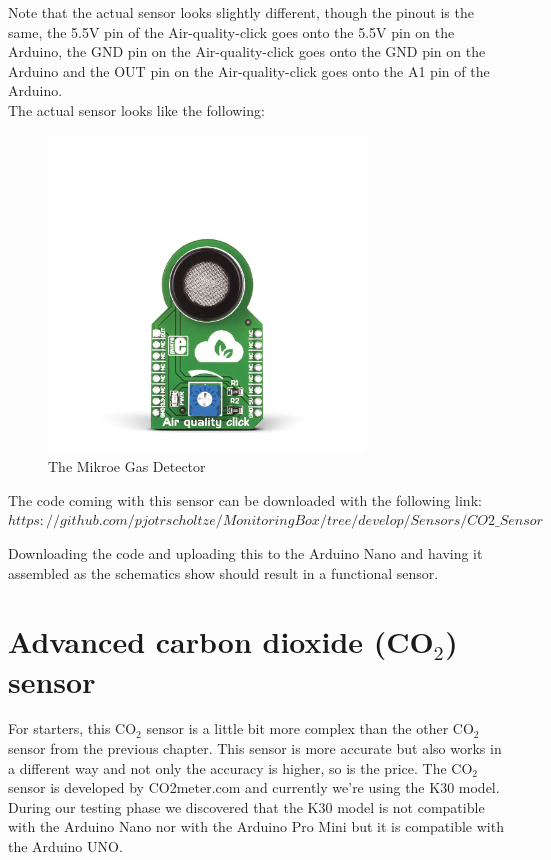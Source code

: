 \documentclass{report}
\begin{document}
Note that the actual sensor looks slightly different, though the pinout is the same, the 5.5V pin of the Air-quality-click goes onto the 5.5V pin on the Arduino, the GND pin on the Air-quality-click  goes onto the GND pin on the Arduino and the OUT pin on the Air-quality-click goes onto the A1 pin of the Arduino. \\
The actual sensor looks like the following:\\

\begin{figure}[H]
	\centering
\includegraphics[width=0.75\textwidth]{images/air-quality-click-breakout.jpg} 
	\caption{The Mikroe Gas Detector}
\end{figure}

The code coming with this sensor can be downloaded with the following link: $ https://github.com/pjotrscholtze/MonitoringBox/tree/develop/Sensors/CO2\_Sensor $


Downloading the code and uploading this to the Arduino Nano and having it assembled as the schematics show should result in a functional sensor. 

\chapter{Advanced carbon dioxide (CO$_2$) sensor}
For starters, this CO$_2$ sensor is a little bit more complex than the other CO$_2$ sensor from the previous chapter. This sensor is more accurate but also works in a different way and not only the accuracy is higher, so is the price. 
The CO$_2$ sensor is developed by CO2meter.com and currently we're using the K30 model. During our testing phase we discovered that the K30 model is not compatible with the Arduino Nano nor with the Arduino Pro Mini but it is compatible with the Arduino UNO. 
\end{document}
